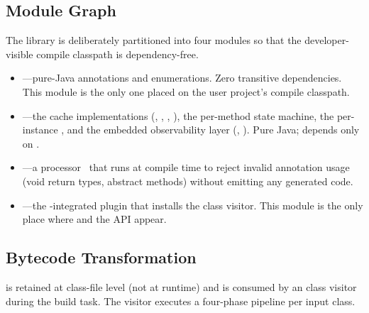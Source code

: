 \subsection{Module Graph}\label{sec:modules}

The library is deliberately partitioned into four modules so that the developer-visible compile classpath is dependency-free.

\begin{itemize}[leftmargin=*,nosep]
    \item {}---pure-Java annotations and enumerations. Zero transitive dependencies. This module is the only one placed on the user project's compile classpath.
    \item {}---the cache implementations (, , , ), the per-method  state machine, the per-instance , and the embedded observability layer (, ). Pure Java; depends only on .
    \item {}---a \ksp processor~\cite{ksp} that runs at compile time to reject invalid annotation usage (void return types, abstract methods) without emitting any generated code.
    \item {}---the \agp-integrated plugin that installs the \asm class visitor. This module is the only place where \asm and the \agp API appear.
\end{itemize}

\subsection{Bytecode Transformation}\label{sec:transform}

 is retained at class-file level (not at runtime) and is consumed by an \asm class visitor during the  build task. The visitor executes a four-phase pipeline per input class.

